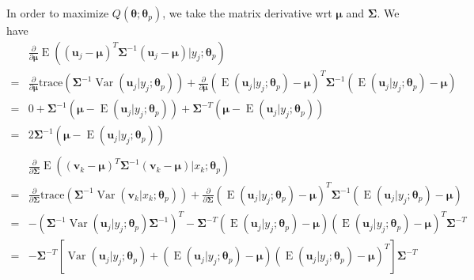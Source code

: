 \documentclass{article}
\DeclareMathOperator{\Var}{Var}
\DeclareMathOperator{\E}{E}
\begin{document}
\begin{enumerate}[font = \bfseries, leftmargin = 0 em]
	In order to maximize $Q(\bm \theta; \bm \theta_p)$, we take the matrix derivative wrt $\bm \mu$ and $\bm \Sigma$. We have
	\begin{align*}
	&\frac{\partial}{\partial \bm \mu} \E\left((\bm u_j - \bm \mu)^T\bm \Sigma^{-1}(\bm u_j - \bm \mu)\big| y_j; \bm \theta_p\right)\\
	=& \frac{\partial}{\partial \bm \mu}\mathrm{trace}\left(\bm \Sigma^{-1} \Var(\bm u_j | y_j; \bm \theta_p)\right) + \frac{\partial}{\partial \bm \mu}\left(\E(\bm u_j|y_j; \bm \theta_p) - \bm \mu\right)^T\bm \Sigma^{-1}\left(\E(\bm u_j|y_j; \bm \theta_p) - \bm \mu\right)\\
	=& 0 + \bm \Sigma^{-1}\left(\bm \mu- \E(\bm u_j|y_j; \bm \theta_p)\right) + \bm \Sigma^{-T}\left(\bm \mu- \E(\bm u_j|y_j; \bm \theta_p)\right)\\
	= & 2 \bm \Sigma^{-1} \left(\bm \mu- \E(\bm u_j|y_j; \bm \theta_p)\right)
	\ \\
	\ \\
	&\frac{\partial}{\partial \bm \Sigma}\E\left((\bm v_k - \bm \mu)^T\bm \Sigma^{-1}(\bm v_k - \bm \mu)\big| x_k; \bm \theta_p\right)\\
	=& \frac{\partial}{\partial \bm \Sigma}\mathrm{trace}\left(\bm \Sigma^{-1} \Var(\bm v_k | x_k; \bm \theta_p)\right) + \frac{\partial}{\partial \bm \Sigma}\left(\E(\bm u_j|y_j; \bm \theta_p) - \bm \mu\right)^T\bm \Sigma^{-1}\left(\E(\bm u_j|y_j; \bm \theta_p) - \bm \mu\right)\\
	= & -\left(\bm \Sigma^{-1} \Var\left(\bm u_j|y_j; \bm \theta_p\right) \bm \Sigma^{-1}\right)^T - \bm \Sigma^{-T}\left(\E(\bm u_j|y_j; \bm \theta_p) - \bm \mu\right)\left(\E(\bm u_j|y_j; \bm \theta_p) - \bm \mu\right)^T \bm \Sigma^{-T}\\
	=& - \bm \Sigma^{-T} \left[\Var\left(\bm u_j|y_j; \bm \theta_p\right) + \left(\E(\bm u_j|y_j; \bm \theta_p) - \bm \mu\right)\left(\E(\bm u_j|y_j; \bm \theta_p) - \bm \mu\right)^T\right]\bm \Sigma^{-T}
	\end{align*}


\end{enumerate}
\end{document}
